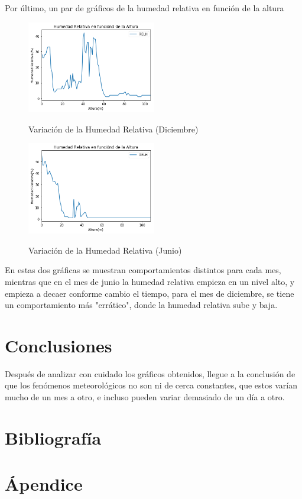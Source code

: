 \documentclass{article}
\begin{document}
Por último, un par de gráficos de la humedad relativa en función de la altura
\begin{figure}[H]
    \caption{Variación de la Humedad Relativa (Diciembre)}
    \includegraphics[width=0.5\textwidth]{HRDic.png}
    \centering
    \label{HUM}
\end{figure}
\begin{figure}[H]
    \caption{Variación de la Humedad Relativa (Junio)}
    \includegraphics[width=0.5\textwidth]{HRJun.png}
    \centering
    \label{HUM}
\end{figure}
En estas dos gráficas se muestran comportamientos distintos para cada mes, mientras que en el mes de junio la humedad relativa empieza en un nivel alto, y empieza a decaer conforme cambio el tiempo, para el mes de diciembre, se tiene un comportamiento más "errático", donde la humedad relativa sube y baja.

\section{Conclusiones}
Después de analizar con cuidado los gráficos obtenidos, llegue a la conclusión de que los fenómenos meteorológicos no son ni de cerca constantes, que estos varían mucho de un mes a otro, e incluso pueden variar demasiado de un día a otro.

\section{Bibliografía}

\section{Ápendice}
\end{document}
